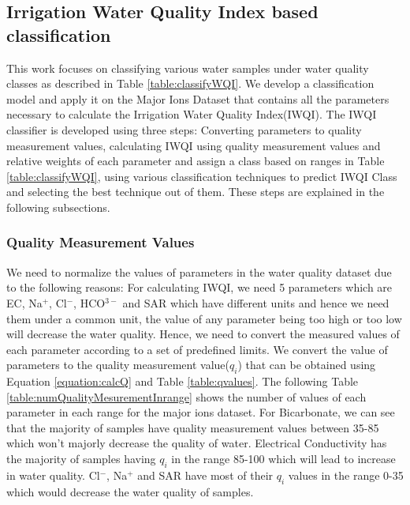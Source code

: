 \subsection{Irrigation Water Quality Index based classification}
\label{subsection:iwqiClassification}
This work focuses on classifying various water samples under water quality classes as described in Table \ref{table:classifyWQI}. We develop a classification model and apply it on the Major Ions Dataset that contains all the parameters necessary to calculate the Irrigation Water Quality Index(IWQI). The IWQI classifier is developed using three steps: Converting parameters to quality measurement values, calculating IWQI using quality measurement values and relative weights of each parameter and assign a class based on ranges in Table \ref{table:classifyWQI}, using various classification techniques to predict IWQI Class and selecting the best technique out of them. These steps are explained in the following subsections. 

\subsubsection{Quality Measurement Values}
\label{subsubsection:qualtityMesurementValues}
We need to normalize the values of parameters in the water quality dataset due to the following reasons: For calculating IWQI, we need 5 parameters which are EC, Na$^+$, Cl$^-$, HCO$^{3-}$ and SAR which have different units and hence we need them under a common unit, the value of any parameter being too high or too low will decrease the water quality. Hence, we need to convert the measured values of each parameter according to a set of predefined limits. We convert the value of parameters to the quality measurement value($q_i$) that can be obtained using Equation \ref{equation:calcQ} and Table \ref{table:qvalues}. The following Table \ref{table:numQualityMesurementInrange} shows the number of values of each parameter in each range for the major ions dataset. For Bicarbonate, we can see that the majority of samples have quality measurement values between 35-85 which won’t majorly decrease the quality of water.  Electrical Conductivity has the majority of samples having $q_i$ in the range 85-100 which will lead to increase in water quality. Cl$^-$, Na$^+$ and SAR have most of their $q_i$ values in the range 0-35 which would decrease the water quality of samples. 

